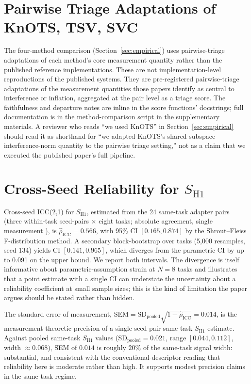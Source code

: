 \documentclass[10pt]{article}
\begin{document}
\section{Pairwise Triage Adaptations of KnOTS, TSV, SVC}
\label{app:adaptations}

The four-method comparison (Section~\ref{sec:empirical}) uses
pairwise-triage adaptations of each method's core measurement
quantity rather than the published reference implementations.
These are not implementation-level reproductions of the published
systems. They are pre-registered pairwise-triage adaptations of
the measurement quantities those papers identify as central to
interference or inflation, aggregated at the pair level as a
triage score. The faithfulness and departure notes are inline in
the score functions' docstrings;
full documentation is in the method-comparison script in the
supplementary materials. A reviewer who reads ``we used KnOTS'' in
Section~\ref{sec:empirical} should read it as shorthand for ``we
adapted KnOTS's shared-subspace interference-norm quantity to the
pairwise triage setting,'' not as a claim that we executed the
published paper's full pipeline.

\section{Cross-Seed Reliability for $S_{\mathrm{H1}}$}
\label{app:reliability}

Cross-seed ICC(2,1) for $S_{\mathrm{H1}}$, estimated from the 24
same-task adapter pairs (three within-task seed-pairs
$\times$ eight tasks; absolute agreement, single measurement
\citep{shrout1979icc}), is
$\hat{\rho}_{\mathrm{ICC}} = 0.566$, with 95\% CI
$[0.165, 0.874]$ by the Shrout--Fleiss F-distribution method.
A secondary block-bootstrap over tasks (5{,}000 resamples, seed
134) yields CI $[0.141, 0.965]$, which diverges from the
parametric CI by up to 0.091 on the upper bound.
We report both intervals. The divergence is itself informative
about parametric-assumption strain at $N = 8$ tasks and illustrates
that a point estimate with a single CI can understate the
uncertainty about a reliability coefficient at small sample
sizes; this is the kind of limitation the paper argues should be
stated rather than hidden.

The standard error of measurement,
$\mathrm{SEM} = \mathrm{SD}_{\mathrm{pooled}} \sqrt{1 - \hat{\rho}_{\mathrm{ICC}}} = 0.014$,
is the measurement-theoretic precision of a single-seed-pair
same-task $S_{\mathrm{H1}}$ estimate. Against pooled same-task
$S_{\mathrm{H1}}$ values ($\mathrm{SD}_{\mathrm{pooled}} = 0.021$,
range $[0.044, 0.112]$, width $\approx 0.068$), SEM of $0.014$ is
roughly $20\%$ of the same-task signal width: substantial, and
consistent with the conventional-descriptor reading that reliability
here is moderate rather than high. It supports modest precision
claims in the same-task regime.
\end{document}
